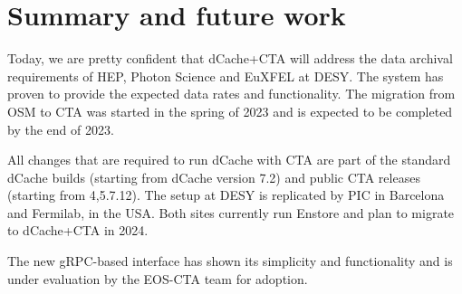 \documentclass{webofc}
\begin{document}
\section{Summary and future work}
\label{summary}

Today, we are pretty confident that dCache+CTA will address the data archival requirements of HEP, Photon Science and EuXFEL at DESY. The system has proven to provide the expected data rates and functionality. The migration from OSM to CTA was started in the spring of 2023 and is expected to be completed by the end of 2023.

All changes that are required to run dCache with CTA are part of the standard dCache builds (starting from dCache version 7.2) and public CTA releases (starting from {4,5}.7.12). The setup at DESY is replicated by PIC in Barcelona and Fermilab, in the USA. Both sites currently run Enstore\cite{enstore} and plan to migrate to dCache+CTA in 2024.
 
The new gRPC-based interface has shown its simplicity and functionality and is under evaluation by the EOS-CTA team for adoption.


\end{document}
